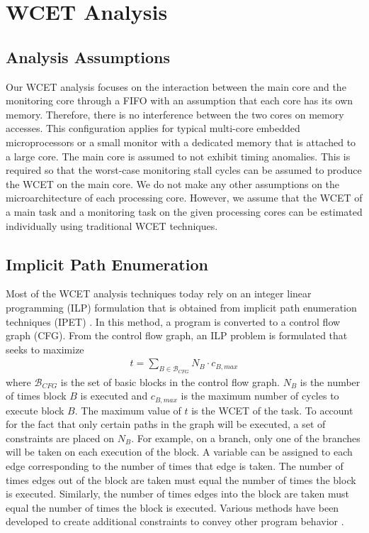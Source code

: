 \section{WCET Analysis}
\label{sec:monitoring_wcet.wcet}

\subsection{Analysis Assumptions}

Our WCET analysis focuses on the interaction between the main core and the
monitoring core through a FIFO with an assumption that each core has its own
memory. Therefore, there is no interference between the two cores on memory
accesses. This configuration applies for typical multi-core embedded
microprocessors or a small monitor with a dedicated memory that is attached to
a large core. The main core is assumed to not exhibit timing anomalies. This is
required so that the worst-case monitoring stall cycles can be assumed to
produce the WCET on the main core.  We do not make any other assumptions on the
microarchitecture of each processing core. However, we assume that the WCET of
a main task and a monitoring task on the given processing cores can be
estimated individually using traditional WCET techniques.

\subsection{Implicit Path Enumeration}
\label{sec:monitoring_wcet.wcet.ipet}

Most of the WCET analysis techniques today rely on an integer linear
programming (ILP) formulation that is
obtained from implicit path enumeration techniques (IPET) \cite{li-ipet-dac95}.  In
this method, a program is converted to a control flow graph (CFG). From the
control flow graph, an ILP problem is formulated that seeks to maximize
\begin{align*}
  t = \sum_{B \in \mathcal{B}_{CFG}}{N_B \cdot c_{B,max}}
\end{align*} 
where $\mathcal{B}_{CFG}$ is the set of basic blocks in the control flow graph.
$N_{B}$ is the number of times block $B$ is executed and $c_{B,max}$ is the
maximum number of cycles to execute block $B$. The maximum value of $t$ is the
WCET of the task.  To account for the fact that only certain paths in the graph
will be executed, a set of constraints are placed on $N_{B}$. For example, on a
branch, only one of the branches will be taken on each execution of the block.
A variable can be assigned to each edge corresponding to the number of times
that edge is taken.  The number of times edges out of the block are taken must
equal the number of times the block is executed.  Similarly, the number of
times edges into the block are taken must equal the number of times the block
is executed. Various methods have been developed to create additional
constraints to convey other program behavior \cite{li-ipet-dac95,
wcetsurvey-tecs08}.

